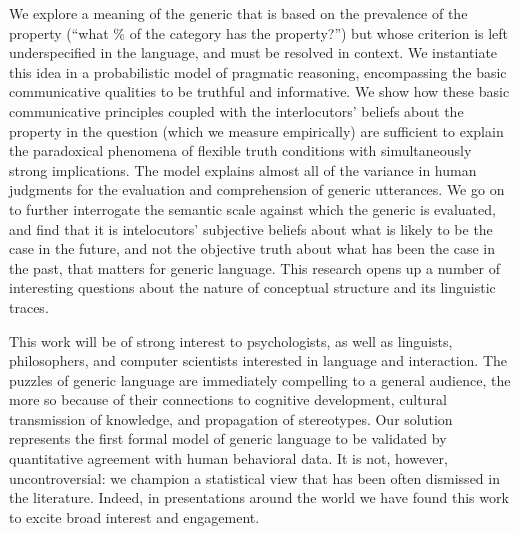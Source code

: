 \documentclass[11pt,letterpaper]{letter} %
\begin{document}
\begin{letter}
We explore a meaning of the generic that is based on the prevalence of the property (``what \% of the category has the property?'') but 
whose criterion is left underspecified in the language, and must be resolved in context.
We instantiate this idea in a probabilistic model of pragmatic reasoning, encompassing the basic communicative qualities to be truthful and informative. 
We show how these basic communicative principles coupled with the interlocutors' beliefs about the property in the question (which we measure empirically) are sufficient to explain the paradoxical phenomena of flexible truth conditions with simultaneously strong implications.
The model explains almost all of the variance in human judgments for the evaluation and comprehension of generic utterances.
We go on to further interrogate the semantic scale against which the generic is evaluated, and find that it is intelocutors' subjective beliefs about what is likely to be the case in the future, and not the objective truth about what has been the case in the past, that matters for generic language. This research opens up a number of interesting questions about the nature of conceptual structure and its linguistic traces.

This work will be of strong interest to psychologists, as well as linguists, philosophers, and computer scientists interested in language and interaction.
The puzzles of generic language are immediately compelling to a general audience, the more so because of their connections to cognitive development, cultural transmission of knowledge, and propagation of stereotypes.
Our solution represents the first formal model of generic language to be validated by quantitative agreement with human behavioral data.
It is not, however, uncontroversial: we champion a statistical view that has been often dismissed in the literature.
Indeed, in presentations around the world we have found this work to excite broad interest and engagement.








\end{letter}
\end{document}

